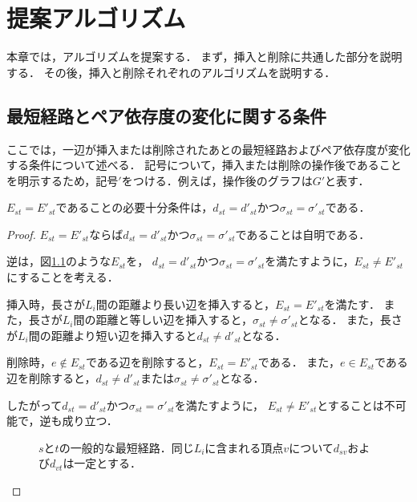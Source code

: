 \chapter{提案アルゴリズム}
\label{chap:algorithm}

本章では，アルゴリズムを提案する．
まず，挿入と削除に共通した部分を説明する．
その後，挿入と削除それぞれのアルゴリズムを説明する．

\section{最短経路とペア依存度の変化に関する条件}
\label{sect:condition-of-variability}

ここでは，一辺が挿入または削除されたあとの最短経路およびペア依存度が変化する条件について述べる．
記号について，挿入または削除の操作後であることを明示するため，記号$'$をつける．例えば，操作後のグラフは$G'$と表す．

\begin{lemma}
  \label{lemma:condition-of-invariability-of-shortest-path}
  $E_{st}=E'_{st}$であることの必要十分条件は，$d_{st}=d'_{st}$かつ$\sigma_{st}=\sigma'_{st}$である．
\end{lemma}
\begin{proof}
  $E_{st}=E'_{st}$ならば$d_{st}=d'_{st}$かつ$\sigma_{st}=\sigma'_{st}$であることは自明である．

  逆は，図\ref{fig:proof-invariability-of-paths}のような$E_{st}$を，
  $d_{st}=d'_{st}$かつ$\sigma_{st}=\sigma'_{st}$を満たすように，$E_{st}\neq E'_{st}$にすることを考える．

  挿入時，長さが$L_i$間の距離より長い辺を挿入すると，$E_{st}=E'_{st}$を満たす．
  また，長さが$L_i$間の距離と等しい辺を挿入すると，$\sigma_{st}\neq\sigma'_{st}$となる．
  また，長さが$L_i$間の距離より短い辺を挿入すると$d_{st}\neq d'_{st}$となる．

  削除時，$e\notin E_{st}$である辺を削除すると，$E_{st}=E'_{st}$である．
  また，$e\in E_{st}$である辺を削除すると，$d_{st}\neq d'_{st}$または$\sigma_{st}\neq\sigma'_{st}$となる．

  したがって$d_{st}=d'_{st}$かつ$\sigma_{st}=\sigma'_{st}$を満たすように，
  $E_{st}\neq E'_{st}$とすることは不可能で，逆も成り立つ．

  \begin{figure}
    \centering
    \def\svgwidth{.5\columnwidth}
    
    \caption{$s$と$t$の一般的な最短経路．同じ$L_i$に含まれる頂点$v$について$d_{sv}$および$d_{vt}$は一定とする．}
    \label{fig:proof-invariability-of-paths}
  \end{figure}
\end{proof}

